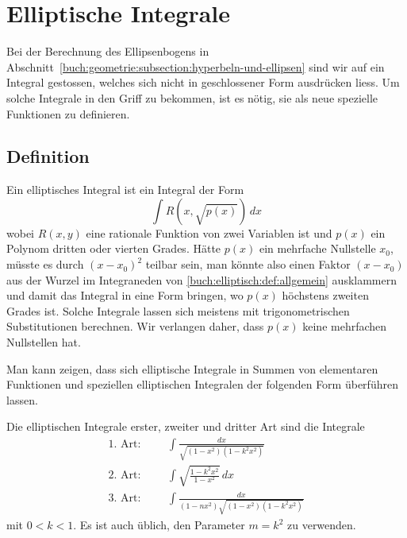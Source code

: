 %
%
%
\section{Elliptische Integrale
\label{buch:elliptisch:section:integral}}
Bei der Berechnung des Ellipsenbogens in 
Abschnitt~\ref{buch:geometrie:subsection:hyperbeln-und-ellipsen}
sind wir auf ein Integral gestossen, welches sich nicht in geschlossener
Form ausdrücken liess.
Um solche Integrale in den Griff zu bekommen, ist es nötig, sie als
neue spezielle Funktionen zu definieren.

\subsection{Definition
\label{buch:elliptisch:subsection:definition}}
Ein elliptisches Integral ist ein Integral der Form
\begin{equation}
\int R\left( x, \sqrt{p(x)}\right)\,dx
\label{buch:elliptisch:def:allgemein}
\end{equation}
wobei $R(x,y)$ eine rationale Funktion von zwei Variablen ist und
$p(x)$ ein Polynom dritten oder vierten Grades.
Hätte $p(x)$ ein mehrfache Nullstelle $x_0$, müsste es durch $(x-x_0)^2$
teilbar sein, man könnte also einen Faktor $(x-x_0)$ aus der
Wurzel im Integraneden von \eqref{buch:elliptisch:def:allgemein}
ausklammern und damit das Integral in eine Form bringen, wo $p(x)$
höchstens zweiten Grades ist.
Solche Integrale lassen sich meistens mit trigonometrischen Substitutionen
berechnen.
Wir verlangen daher, dass $p(x)$ keine mehrfachen Nullstellen hat.

Man kann zeigen, dass sich elliptische Integrale in Summen von
elementaren Funktionen und speziellen elliptischen Integralen 
der folgenden Form überführen lassen.

\begin{definition}
\label{buch:elliptisch:def:integrale123}
Die elliptischen Integrale erster, zweiter und dritter Art sind die
Integrale
\[
\begin{aligned}
\text{1.~Art:}&&&
\int \frac{dx}{\sqrt{(1-x^2)(1-k^2x^2)}}
\\
\text{2.~Art:}&&&
\int \sqrt{\frac{1-k^2x^2}{1-x^2}}\,dx
\\
\text{3.~Art:}&&&
\int \frac{dx}{(1-nx^2)\sqrt{(1-x^2)(1-k^2x^2)}}
\end{aligned}
\]
mit $0<k<1$.
Es ist auch üblich, den Parameter $m=k^2$ zu verwenden.
\end{definition}

